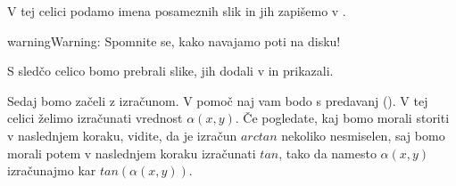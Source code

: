 \documentclass[letterpaper,10pt,english]{sphinxmanual}
\begin{document}
\sphinxAtStartPar
V tej celici podamo imena posameznih slik in jih zapišemo v .

\begin{sphinxadmonition}{warning}{Warning:}
\sphinxAtStartPar
Spomnite se, kako navajamo poti na disku!
\end{sphinxadmonition}

\begin{sphinxVerbatim}[commandchars=\\\{\},numbers=left,firstnumber=1,stepnumber=1]
  \PYG{p}{[}\PYG{p}{]}




\end{sphinxVerbatim}

\sphinxAtStartPar
S sledčo celico bomo prebrali slike, jih dodali v   in prikazali.

\begin{sphinxVerbatim}[commandchars=\\\{\},numbers=left,firstnumber=1,stepnumber=1]
  \PYG{p}{[}\PYG{p}{]}


    
  

      




\end{sphinxVerbatim}

\sphinxAtStartPar
Sedaj bomo začeli z izračunom. V pomoč naj vam bodo  s predavanj (). V tej celici želimo izračunati vrednost \({\alpha}(x,y)\). Če pogledate, kaj bomo morali storiti v naslednjem koraku, vidite, da je izračun \(arctan\) nekoliko nesmiselen, saj bomo morali potem v naslednjem koraku izračunati \(tan\), tako da namesto \({\alpha}(x,y)\) izračunajmo kar \(tan({\alpha}(x,y))\).
\end{document}
